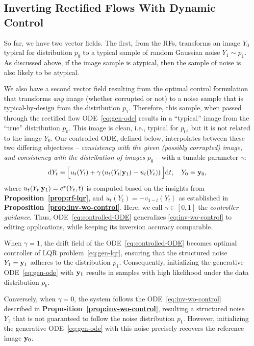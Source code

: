 \documentclass{article} %
\theoremstyle{plain}
\newcommand{\deriv}{\mathrm{d}}
\begin{document}
\subsection{Inverting Rectified Flows With Dynamic Control}
\label{sec:rf-inv}
So far, we have two vector fields. The first, from the RFs, transforms an image $Y_0$ typical for distribution $p_0$ to a typical sample of random Gaussian noise $Y_1 \sim p_1.$ As discussed above, if the image sample is atypical, then the sample of noise is also likely to be atypical. 

We also have a second vector field resulting from the optimal control formulation that transforms {\em any} image (whether corrupted or not) to a noise sample that is typical-by-design from the distribution $p_1$. Therefore, this sample, when passed through the rectified flow ODE~\eqref{eq:gen-ode} results in a ``typical'' image from the ``true'' distribution $p_0$. This image is clean, i.e., typical for $p_0$, but it is not related to the image $Y_0$.
Our controlled ODE, defined below, interpolates between these two differing objectives -- {\em consistency with the given (possibly corrupted) image, and consistency with the distribution of images $p_0$} -- with a tunable parameter $\gamma$:
\begin{align}
    \label{eq:controlled-ODE}
    \deriv Y_t = \Big[u_t(Y_t) + \gamma \left(u_t(Y_t|\rvy_1) - u_t(Y_t)\right) \Big] \deriv t, \quad Y_0 = \rvy_0,
\end{align}
where $u_t(Y_t|{\mathbf{y}}_1) = c^*(Y_t,t)$ is computed based on the insights from \textbf{Proposition~\ref{prop:rf-lqr}}, and $u_t(Y_t) = -v_{1-t}(Y_t)$ as established in \textbf{Proposition~\ref{prop:inv-wo-control}}.
Here, we call $\gamma \in [0,1]$ the {\em controller guidance}. 
Thus, ODE~\eqref{eq:controlled-ODE} generalizes \eqref{eq:inv-wo-control} to editing applications, while keeping its inversion accuracy comparable.

When $\gamma=1$, the drift field of the ODE~\eqref{eq:controlled-ODE} becomes optimal controller of LQR problem~\eqref{eq:gen-lqr}, ensuring that the structured noise $Y_1 = {\mathbf{y}}_1$ adheres to the distribution $p_1$. Consequently, initializing the generative ODE~\eqref{eq:gen-ode} with ${\mathbf{y}}_1$ results in samples with high likelihood under the data distribution $p_0$. 

Conversely, when $\gamma = 0$, the system follows the ODE~\eqref{eq:inv-wo-control} described in \textbf{Proposition~\ref{prop:inv-wo-control}}, resulting a structured noise $Y_1$ that is not guaranteed to follow the noise distribution $p_1$.
However, initializing the generative ODE~\eqref{eq:gen-ode} with this noise precisely recovers the reference image ${\mathbf{y}}_0$.
\end{document}
